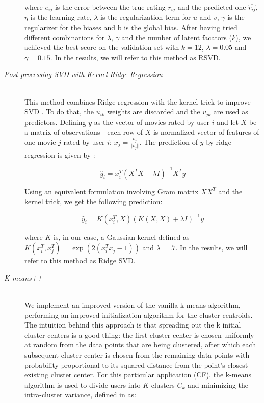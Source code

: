 \documentclass[10pt,conference,compsocconf]{IEEEtran}
\begin{document}
\begin{description}
\noindent where $e_{ij}$ is the error between the true rating $r_{ij}$ and the predicted one $\hat{r_{ij}}$, $\eta$ is the learning rate, $\lambda$ is the regularization term for $u$ and $v$, $\gamma$ is the regularizer for the biases and b is the global bias. After having tried different combinations for $\lambda$, $\gamma$ and the number of latent facators ($k$), we achieved the best score on the validation set with $k = 12$, $\lambda = 0.05$ and $\gamma = 0.15$. In the results, we will refer to this method as RSVD.
\item[\emph{Post-processing SVD with Kernel Ridge Regression}] \ \\
This method combines Ridge regression with the kernel trick to improve SVD  \cite{paterek}. To do that, the $u_{ik}$ weights are discarded and the $v_{jk}$ are used as predictors. Defining $y$ as the vector of movies rated by user $i$ and let $X$ be a matrix of observations - each row of $X$ is normalized vector of features of one movie $j$ rated by user $i$: $x_j = \frac{v_j}{\Vert v_j \Vert}$. The prediction of $y$ by ridge regression is given by	:

$$
\hat{y}_i = x_i^T(X^TX + \lambda I)^{-1}X^Ty
$$

\noindent Using an equivalent formulation involving Gram matrix $XX^T$ and the kernel trick, we get the following prediction:

$$
\hat{y}_i = K(x_i^T,X)(K(X,X) + \lambda I)^{-1}y
$$

\noindent where $K$ is, in our case, a Gaussian kernel defined as $K(x_i^T, x_j^T) = \exp(2(x_i^Tx_j-1))$ and $\lambda = .7$. In the results, we will refer to this method as Ridge SVD.
 
 
\item[\emph{K-means++}]\ \\
We implement an improved version of the vanilla k-means algorithm, performing an improved initialization algorithm for the cluster centroids. The intuition behind this approach is that spreading out the k initial cluster centers is a good thing: the first cluster center is chosen uniformly at random from the data points that are being clustered, after which each subsequent cluster center is chosen from the remaining data points with probability proportional to its squared distance from the point's closest existing cluster center. For this particular application (CF), the k-means algorithm is used to divide users into $K$ clusters $C_k$ and minimizing the intra-cluster variance, defined in \cite{paterek} as:


\end{description}
\end{document}
